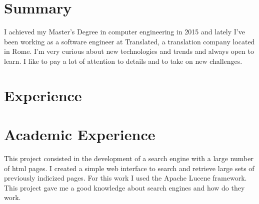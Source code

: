 \documentclass[11pt,a4paper,sans]{moderncv} %
\begin{document}
\makecvtitle %

\section{Summary}
I achieved my Master's Degree in computer engineering in 2015 and lately I've been working as a software engineer at Translated, a translation company located in Rome.
\newline{}
I'm very curious about new technologies and trends and always open to learn. I like to pay a lot of attention to details and to take on new challenges.


\section{Experience}



\section{Academic Experience}

{This project consisted in the development of a search engine with a large number of html pages. I created a simple web interface to search and retrieve large sets of previously indicized pages. For this work I used the Apache Lucene framework. This project gave me a good knowledge about search engines and how do they work.}
\end{document}
